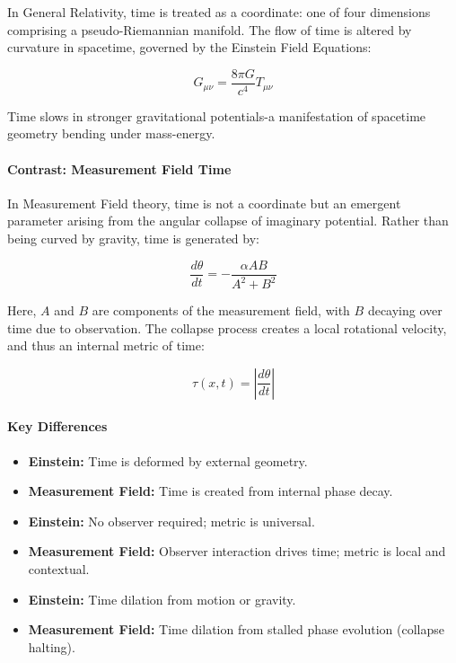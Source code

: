 In General Relativity, time is treated as a coordinate: one of four dimensions comprising a pseudo-Riemannian manifold. \cite{chapter_time} The flow of time is altered by curvature in spacetime, governed by the Einstein Field Equations:

\[
G_{\mu\nu} = \frac{8\pi G}{c^4} T_{\mu\nu}
\]

Time slows in stronger gravitational potentials-a manifestation of spacetime geometry bending under mass-energy. \cite{chapter_time} \paragraph{Contrast: Measurement Field Time}

In Measurement Field theory, time is not a coordinate but an emergent parameter arising from the angular collapse of imaginary potential. \cite{chapter_time} Rather than being curved by gravity, time is generated by:

\[
\frac{d\theta}{dt} = -\frac{\alpha A B}{A^2 + B^2}
\]

Here, $A$ and $B$ are components of the measurement field, with $B$ decaying over time due to observation. \cite{chapter_time} The collapse process creates a local rotational velocity, and thus an internal metric of time:

\[
\tau(x,t) = \left| \frac{d\theta}{dt} \right|
\]

\paragraph{Key Differences}

\begin{itemize}
  \item \textbf{Einstein:} Time is deformed by external geometry. \cite{chapter_time} \item \textbf{Measurement Field:} Time is created from internal phase decay. \cite{chapter_time} \item \textbf{Einstein:} No observer required; metric is universal. \cite{chapter_time} \item \textbf{Measurement Field:} Observer interaction drives time; metric is local and contextual. \cite{chapter_time} \item \textbf{Einstein:} Time dilation from motion or gravity. \cite{chapter_time} \item \textbf{Measurement Field:} Time dilation from stalled phase evolution (collapse halting). \cite{chapter_time} \end{itemize}

